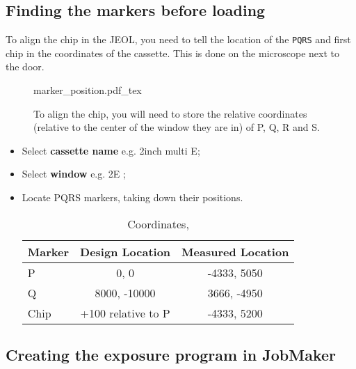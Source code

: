 \subsection{Finding the markers before loading}
\label{sec:marker_location}

To align the chip in the JEOL,  you need to tell  the location of
the \texttt{PQRS}  and first chip in  the coordinates of the  cassette.  This is
done on the microscope next to the door.

\begin{figure}[h]
  \centering
  \def\svgwidth{8cm}{marker_position.pdf_tex}
  \caption{\small  To align  the  chip,  you will  need  to  store the  relative
    coordinates (relative to  the center of the  window they are in) of  P, Q, R
    and S.\label{fig:marker_position}}
\end{figure}

\begin{framed}\noindent
\end{framed}

\begin{itemize}
\item Select \textbf{cassette name} e.g.  {2inch multi E};
\item Select  \textbf{window} e.g.  2E \ira  {};
\item Locate PQRS markers, taking down their positions.

  \begin{table}[htbp]
    \centering
    \caption{Coordinates, \label{tab:p-and-q}}
    \begin{tabular}{|l|c|c|}
      \hline
      \textbf{Marker} & \textbf{Design Location} & \textbf{Measured Location}\\\hline
      P & 0, 0 & -4333, 5050\\
      Q & 8000, -10000 & 3666, -4950\\
      Chip & +100 relative to P & -4333, 5200 \\\hline
    \end{tabular}
  \end{table}
\end{itemize}

\subsection{Creating the exposure program in JobMaker}\label{sec:jobmaker}

